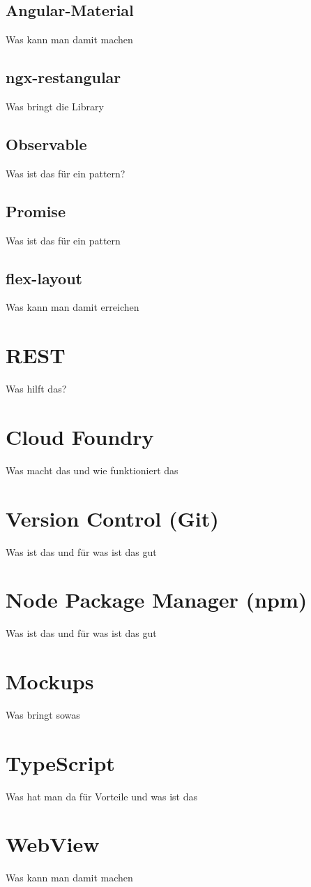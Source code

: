 \subsection{Angular-Material}
Was kann man damit machen

\subsection{ngx-restangular}
Was bringt die Library

\subsection{Observable}
Was ist das für ein pattern?

\subsection{Promise}
Was ist das für ein pattern

\subsection{flex-layout}
Was kann man damit erreichen

\section{REST}
Was hilft das?

\section{Cloud Foundry}
Was macht das und wie funktioniert das

\section{Version Control (Git)}
Was ist das und für was ist das gut

\section{Node Package Manager (npm)}
Was ist das und für was ist das gut

\section{Mockups}
Was bringt sowas

\section{TypeScript}
Was hat man da für Vorteile und was ist das

\section{WebView}
Was kann man damit machen